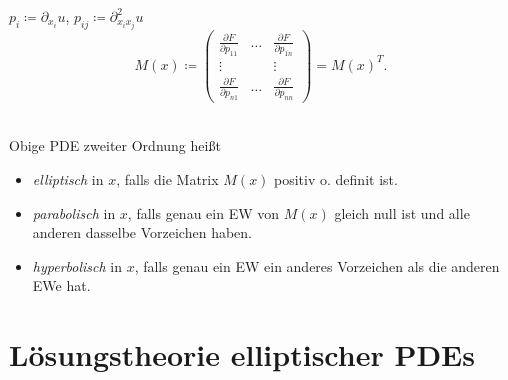 \documentclass{cheat-sheet}
\begin{document}
\begin{nota}
  $p_i \coloneqq \partial_{x_i} u$, $p_{ij} \coloneqq \partial^2_{x_i x_j} u$
  \[
    M(x) \coloneqq \begin{pmatrix}
      \tfrac{\partial F}{\partial p_{11}} & \hdots & \tfrac{\partial F}{\partial p_{1n}} \\
      \vdots && \vdots \\
      \tfrac{\partial F}{\partial p_{n1}} & \hdots & \tfrac{\partial F}{\partial p_{nn}}
    \end{pmatrix} = M(x)^{T}.
  \]
\end{nota}

\begin{defn}\mbox{}\\
  Obige PDE zweiter Ordnung heißt
  \begin{itemize}
    \item \emph{elliptisch} in $x$, falls die Matrix $M(x)$ positiv o. definit ist.
    \item \emph{parabolisch} in $x$, falls genau ein EW von $M(x)$ gleich null ist und alle anderen dasselbe Vorzeichen haben.
    \item \emph{hyperbolisch} in $x$, falls genau ein EW ein anderes Vorzeichen als die anderen EWe hat.
  \end{itemize}
\end{defn}



\section{Lösungstheorie elliptischer PDEs}
\end{document}
